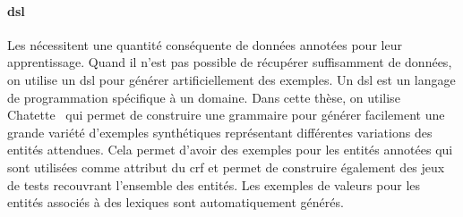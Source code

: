\paragraph{\acrshort*{dsl}}
Les  nécessitent une quantité conséquente de données annotées pour leur apprentissage.
Quand il n'est pas possible de récupérer suffisamment de données, on utilise un \gls{dsl} pour générer artificiellement des exemples.
Un \gls{dsl} est un langage de programmation spécifique à un domaine.
Dans cette thèse, on utilise Chatette~\cite{ChatetteDatasetGenerator2024} qui permet de construire une grammaire pour générer facilement une grande variété d'exemples synthétiques représentant différentes variations des entités attendues.
Cela permet d'avoir des exemples pour les entités annotées qui sont utilisées comme attribut du \gls{crf} et permet de construire également des jeux de tests recouvrant l'ensemble des entités.
Les exemples de valeurs pour les entités associés à des lexiques sont automatiquement générés.

